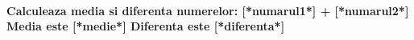 \documentclass{exam}
\begin{document}
\paragraph{
Calculeaza media si diferenta numerelor: [*numarul1*] + [*numarul2*]\\
Media este [*medie*]
Diferenta este [*diferenta*]
}
\end{document}
